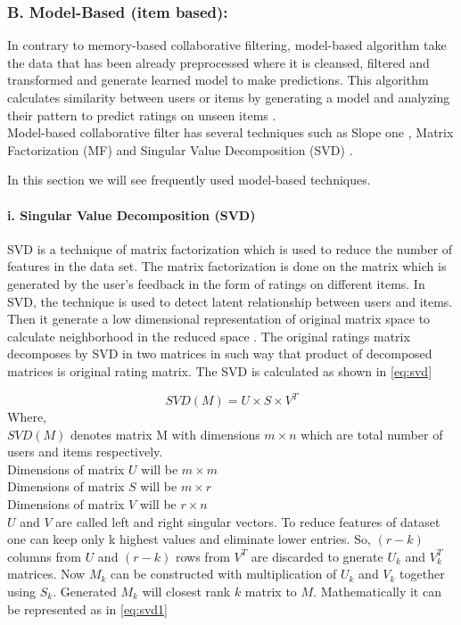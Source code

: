 \subsubsection{B. Model-Based (item based):}
In contrary to memory-based collaborative filtering, model-based algorithm take the data that has been already preprocessed where it is cleansed, filtered and transformed and generate learned model to make predictions. This algorithm calculates similarity between users or items by generating a model and analyzing their pattern to predict ratings on unseen items \cite{28,29,30} .
\\
Model-based collaborative filter has several techniques such as Slope one \cite{31}, Matrix Factorization (MF) and Singular Value Decomposition (SVD) \cite{28}. 

In this section we will see frequently used model-based techniques.
\\

\paragraph{i. Singular Value Decomposition (SVD) }
SVD is a technique of matrix factorization which is used to reduce the number of features in the data set. The matrix factorization is done on the matrix which is generated by the user's feedback in the form of ratings on different items. In SVD, the technique is used to detect latent relationship between users and items. Then it generate a low dimensional representation of original matrix space to calculate neighborhood in the reduced space \cite{32}. The original ratings matrix decomposes by SVD in two matrices in such way that product of decomposed matrices is original rating matrix. The SVD is calculated as shown in \autoref{eq:svd}

\begin{equation}
SVD(M) = U \times S \times V^{T} 
\label{svd}
\end{equation}
\noindent Where,\\
$SVD(M)$ denotes matrix M with dimensions $m \times n$ which are total number of users and items respectively.\\
Dimensions of matrix $U$ will be $m \times m$ \\
Dimensions of matrix $S$ will be $m \times r$ \\
Dimensions of matrix $V$ will be $r \times n$ \\
$U$ and $V$ are called left and right singular vectors. To reduce features of dataset one can keep only k highest values and eliminate lower entries. So, $(r-k)$ columns from $U$ and $(r-k)$ rows from $V^{T}$ are discarded to gnerate $U_{k}$ and $V_{k}^{T}$ matrices. Now $M_{k}$ can be constructed with multiplication of $U_{k}$ and $V_{k}$ together using $S_{k}$. Generated $M_{k}$ will closest rank $k$ matrix to $M$. Mathematically it can be represented as in \autoref{eq:svd1}

